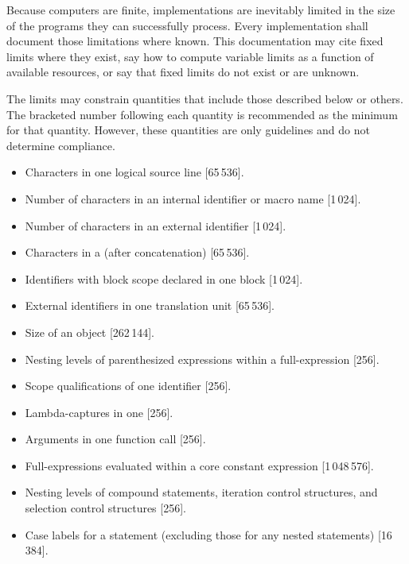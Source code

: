 
\pnum
Because computers are finite, \Cpp{}  implementations are inevitably
limited in the size of the programs they can successfully process.
Every implementation shall
document those limitations where known.
This documentation may cite fixed limits where they
exist, say how to compute variable limits as a function
of available resources, or say that fixed limits do not exist
or are unknown.

\pnum
The limits may constrain quantities
that include those described below or others.
The bracketed number following each quantity is recommended
as the minimum for that quantity.
However, these quantities are only guidelines and do not determine compliance.
\begin{itemize}
\item%
Characters in one logical source line [65\,536].
\item%
Number of
characters in an internal identifier
or macro name [1\,024].
\item%
Number of
characters in an external identifier [1\,024].
\item%
Characters in a 
(after concatenation) [65\,536].

\item%
Identifiers with block scope declared in one block [1\,024].
\item%
External identifiers in one translation unit [65\,536].
\item%
Size of an object [262\,144].

\item%
Nesting levels of parenthesized expressions within a full-expression [256].
\item%
Scope qualifications of one identifier [256].
\item%
Lambda-captures in one  [256].
\item%
Arguments in one function call [256].
\item%
Full-expressions evaluated within a core constant expression [1\,048\,576].

\item%
Nesting levels of compound statements,
iteration control structures,
and selection control structures [256].
\item%
Case labels for a
statement (excluding those for any nested
statements)
[16\,384].


\end{itemize}
